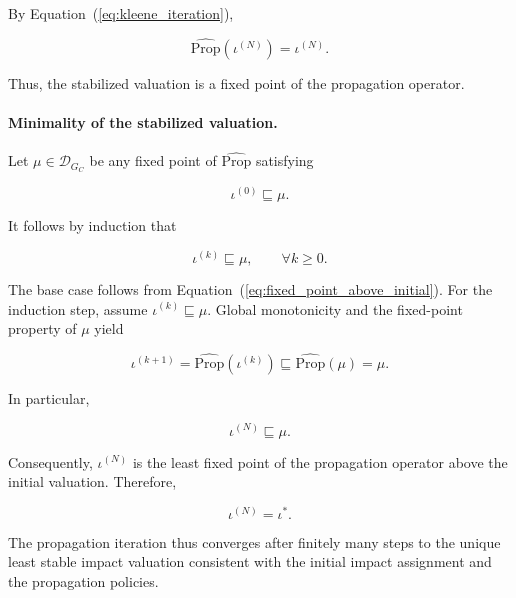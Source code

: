 \documentclass[10pt]{article}
\begin{document}
By Equation~(\ref{eq:kleene_iteration}),

\begin{equation}
	\widehat{\mathrm{Prop}}
	\!\left(
	\iota^{(N)}
	\right)
	=
	\iota^{(N)}.
	\label{eq:iteration_fixed_point}
\end{equation}

Thus, the stabilized valuation is a fixed point of the propagation operator.

\paragraph{Minimality of the stabilized valuation.}

Let $\mu\in\mathcal D_{G_C}$ be any fixed point of
$\widehat{\mathrm{Prop}}$ satisfying

\begin{equation}
	\iota^{(0)}
	\sqsubseteq
	\mu.
	\label{eq:fixed_point_above_initial}
\end{equation}

It follows by induction that

\begin{equation}
	\iota^{(k)}
	\sqsubseteq
	\mu,
	\qquad
	\forall k\geq 0.
	\label{eq:iteration_below_fixed_point}
\end{equation}

The base case follows from
Equation~(\ref{eq:fixed_point_above_initial}). For the induction step, assume
$\iota^{(k)}\sqsubseteq\mu$. Global monotonicity and the fixed-point property of
$\mu$ yield

\begin{equation}
	\iota^{(k+1)}
	=
	\widehat{\mathrm{Prop}}
	\!\left(
	\iota^{(k)}
	\right)
	\sqsubseteq
	\widehat{\mathrm{Prop}}(\mu)
	=
	\mu.
	\label{eq:minimality_induction_step}
\end{equation}

In particular,

\begin{equation}
	\iota^{(N)}
	\sqsubseteq
	\mu.
	\label{eq:stabilized_minimality}
\end{equation}

Consequently, $\iota^{(N)}$ is the least fixed point of the propagation
operator above the initial valuation. Therefore,

\begin{equation}
	\iota^{(N)}
	=
	\iota^{*}.
	\label{eq:iteration_lfp}
\end{equation}

The propagation iteration thus converges after finitely many steps to the
unique least stable impact valuation consistent with the initial impact
assignment and the propagation policies.
\end{document}
